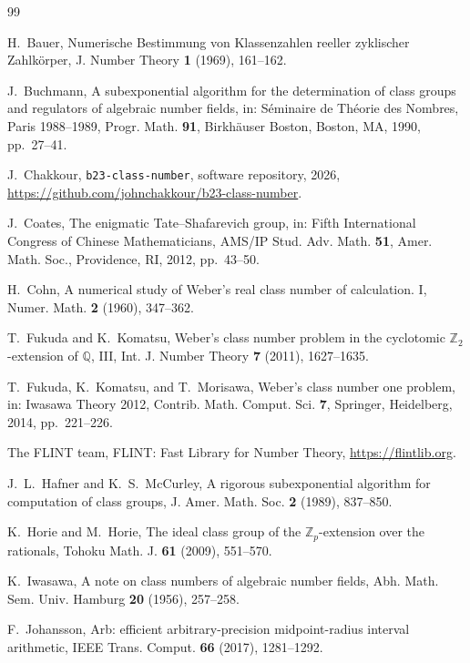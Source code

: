 \documentclass[11pt,a4paper]{ltjsarticle}
\theoremstyle{ja}
\begin{document}
\begin{thebibliography}{99}

 H.~Bauer, Numerische Bestimmung von Klassenzahlen reeller zyklischer Zahlk\"orper, J. Number Theory \textbf{1} (1969), 161--162.

 J.~Buchmann, A subexponential algorithm for the determination of class groups and regulators of algebraic number fields, in: S\'eminaire de Th\'eorie des Nombres, Paris 1988--1989, Progr. Math. \textbf{91}, Birkh\"auser Boston, Boston, MA, 1990, pp.~27--41.

 J.~Chakkour, \texttt{b23-class-number}, software repository, 2026, \url{https://github.com/johnchakkour/b23-class-number}.

 J.~Coates, The enigmatic Tate--Shafarevich group, in: Fifth International Congress of Chinese Mathematicians, AMS/IP Stud. Adv. Math. \textbf{51}, Amer. Math. Soc., Providence, RI, 2012, pp.~43--50.

 H.~Cohn, A numerical study of Weber's real class number of calculation. I, Numer. Math. \textbf{2} (1960), 347--362.

 T.~Fukuda and K.~Komatsu, Weber's class number problem in the cyclotomic $\mathbb{Z}_2$-extension of $\mathbb{Q}$, III, Int. J. Number Theory \textbf{7} (2011), 1627--1635.

 T.~Fukuda, K.~Komatsu, and T.~Morisawa, Weber's class number one problem, in: Iwasawa Theory 2012, Contrib. Math. Comput. Sci. \textbf{7}, Springer, Heidelberg, 2014, pp.~221--226.

 The FLINT team, FLINT: Fast Library for Number Theory, \url{https://flintlib.org}.

 J.~L.~Hafner and K.~S.~McCurley, A rigorous subexponential algorithm for computation of class groups, J. Amer. Math. Soc. \textbf{2} (1989), 837--850.

 K.~Horie and M.~Horie, The ideal class group of the $\mathbb{Z}_p$-extension over the rationals, Tohoku Math. J. \textbf{61} (2009), 551--570.

 K.~Iwasawa, A note on class numbers of algebraic number fields, Abh. Math. Sem. Univ. Hamburg \textbf{20} (1956), 257--258.

 F.~Johansson, Arb: efficient arbitrary-precision midpoint-radius interval arithmetic, IEEE Trans. Comput. \textbf{66} (2017), 1281--1292.


\end{thebibliography}
\end{document}
